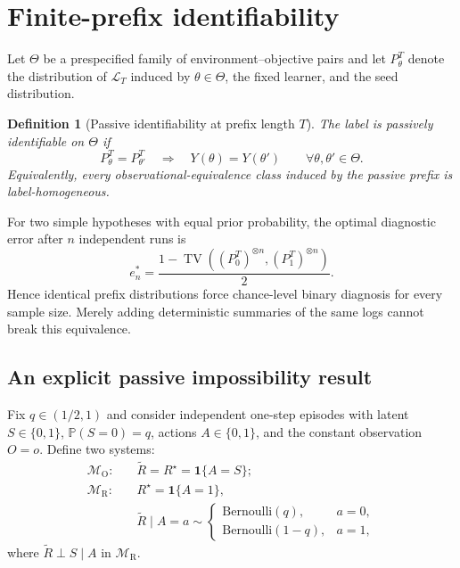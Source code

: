 \documentclass[9pt,twocolumn]{extarticle}
\newtheorem{definition}{Definition}
\newcommand{\Pp}{\mathbb{P}}
\newcommand{\TV}{\operatorname{TV}}
\newcommand{\ind}{\mathbf{1}}
\newcommand{\Dpre}{\mathcal{L}_{T}}
\begin{document}
\section{Finite-prefix identifiability}

Let $\Theta$ be a prespecified family of environment--objective pairs and let
$P_{\theta}^{T}$ denote the distribution of $\Dpre$ induced by
$\theta\in\Theta$, the fixed learner, and the seed distribution.

\begin{definition}[Passive identifiability at prefix length $T$]
The label is passively identifiable on $\Theta$ if
\begin{equation}
P_\theta^T=P_{\theta'}^T\quad\Longrightarrow\quad
Y(\theta)=Y(\theta')
\qquad\forall\theta,\theta'\in\Theta.
\label{eq:identifiability}
\end{equation}
Equivalently, every observational-equivalence class induced by the passive
prefix is label-homogeneous.
\end{definition}

For two simple hypotheses with equal prior probability, the optimal diagnostic
error after $n$ independent runs is
\begin{equation}
e_n^*=\frac{1-\TV\!\left((P_0^T)^{\otimes n},
(P_1^T)^{\otimes n}\right)}{2}.
\label{eq:lecam}
\end{equation}
Hence identical prefix distributions force chance-level binary diagnosis for
every sample size. Merely adding deterministic summaries of the same logs
cannot break this equivalence.

\subsection{An explicit passive impossibility result}

Fix $q\in(1/2,1)$ and consider independent one-step episodes with latent
$S\in\{0,1\}$, $\Pp(S=0)=q$, actions $A\in\{0,1\}$, and the constant
observation $O=o$. Define two systems:
\begin{align*}
\mathcal M_{\mathrm O}:\quad
&\widetilde R=R^\star=\ind\{A=S\};\\
\mathcal M_{\mathrm R}:\quad
&R^\star=\ind\{A=1\},\\[-0.25em]
&\widetilde R\mid A=a\sim
\begin{cases}
\mathrm{Bernoulli}(q),&a=0,\\
\mathrm{Bernoulli}(1-q),&a=1,
\end{cases}
\end{align*}
where $\widetilde R\perp S\mid A$ in $\mathcal M_{\mathrm R}$.
\end{document}
